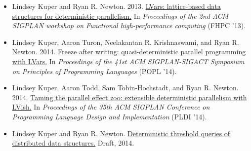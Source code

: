 \begin{itemize}
\item Lindsey Kuper and Ryan
  R. Newton. 2013. \href{http://doi.acm.org/10.1145/2502323.2502326}{LVars:
    lattice-based data structures for deterministic parallelism.} In
  \emph{Proceedings of the 2nd ACM SIGPLAN workshop on Functional
    high-performance computing} (FHPC '13).

\item Lindsey Kuper, Aaron Turon, Neelakantan R. Krishnaswami, and
  Ryan
  R. Newton. 2014. \href{http://doi.acm.org/10.1145/2535838.2535842
  }{Freeze after writing: quasi-deterministic parallel programming
    with LVars.} In \emph{Proceedings of the 41st ACM SIGPLAN-SIGACT
    Symposium on Principles of Programming Languages} (POPL '14).

\item Lindsey Kuper, Aaron Todd, Sam Tobin-Hochstadt, and Ryan
  R. Newton. 2014. \href{http://doi.acm.org/10.1145/2594291.2594312
  }{Taming the parallel effect zoo: extensible deterministic
    parallelism with LVish.} In \emph{Proceedings of the 35th ACM
    SIGPLAN Conference on Programming Language Design and
    Implementation} (PLDI '14).

\item Lindsey Kuper and Ryan
  R. Newton. \href{http://www.cs.indiana.edu/~lkuper/papers/threshold-queries-draft.pdf}{Deterministic
    threshold queries of distributed data structures.} Draft,
  2014.

\end{itemize}

